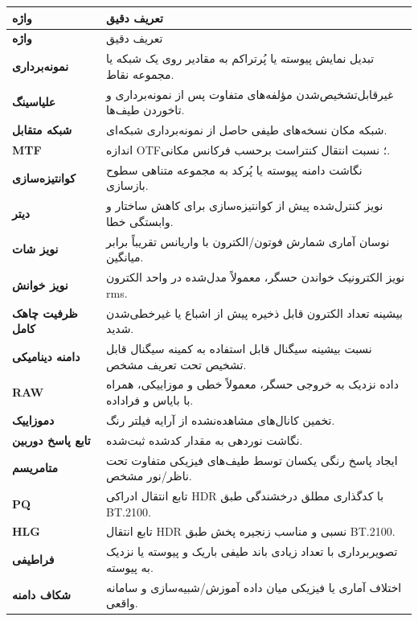 \begin{longtable}{>{\bfseries}p{}p{}}
\toprule
واژه & تعریف دقیق\\
\midrule
\endfirsthead
\toprule
واژه & تعریف دقیق\\
\midrule
\endhead
نمونه‌برداری & تبدیل نمایش پیوسته یا پُرتراکم به مقادیر روی یک شبکه یا مجموعه نقاط.\\
علیاسینگ & غیرقابل‌تشخیص‌شدن مؤلفه‌های متفاوت پس از نمونه‌برداری و تاخوردن طیف‌ها.\\
شبکه متقابل & شبکه مکان نسخه‌های طیفی حاصل از نمونه‌برداری شبکه‌ای.\\
MTF & اندازه OTF؛ نسبت انتقال کنتراست برحسب فرکانس مکانی.\\
کوانتیزه‌سازی & نگاشت دامنه پیوسته یا پُرکد به مجموعه متناهی سطوح بازسازی.\\
دیتر & نویز کنترل‌شده پیش از کوانتیزه‌سازی برای کاهش ساختار و وابستگی خطا.\\
نویز شات & نوسان آماری شمارش فوتون/الکترون با واریانس تقریباً برابر میانگین.\\
نویز خوانش & نویز الکترونیک خواندن حسگر، معمولاً مدل‌شده در واحد الکترون rms.\\
ظرفیت چاهک کامل & بیشینه تعداد الکترون قابل ذخیره پیش از اشباع یا غیرخطی‌شدن شدید.\\
دامنه دینامیکی & نسبت بیشینه سیگنال قابل استفاده به کمینه سیگنال قابل تشخیص تحت تعریف مشخص.\\
RAW & داده نزدیک به خروجی حسگر، معمولاً خطی و موزاییکی، همراه با بایاس و فراداده.\\
دموزاییک & تخمین کانال‌های مشاهده‌نشده از آرایه فیلتر رنگ.\\
تابع پاسخ دوربین & نگاشت نوردهی به مقدار کدشده ثبت‌شده.\\
متامریسم & ایجاد پاسخ رنگی یکسان توسط طیف‌های فیزیکی متفاوت تحت ناظر/نور مشخص.\\
PQ & تابع انتقال ادراکی HDR با کدگذاری مطلق درخشندگی طبق BT.2100.\\
HLG & تابع انتقال HDR نسبی و مناسب زنجیره پخش طبق BT.2100.\\
فراطیفی & تصویربرداری با تعداد زیادی باند طیفی باریک و پیوسته یا نزدیک به پیوسته.\\
شکاف دامنه & اختلاف آماری یا فیزیکی میان داده آموزش/شبیه‌سازی و سامانه واقعی.\\
\bottomrule
\end{longtable}
